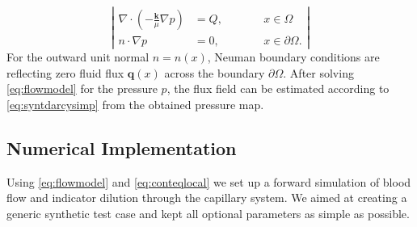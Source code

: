 \documentclass[journal,twocolumn]{IEEEtran}
\newcommand{\vq}{\mathbf{q}}
\begin{document}
	\begin{equation}
		\left\vert
		\begin{alignedat}{2}
			\nabla \cdot \left( -\frac{\mathbf{k}}{\mu} \nabla p \right) &= Q,  \qquad &&x \in \Omega \\
			n \cdot \nabla p &=0, &&x \in \partial \Omega.
		\end{alignedat}
		\right\vert 
		\label{eq:flowmodel}
	\end{equation}
	For the outward unit normal $n=n(x)$, Neuman boundary conditions are reflecting zero fluid flux $\vq(x)$ across the boundary $\partial \Omega$.
	After solving \eqref{eq:flowmodel} for the pressure $p$, the flux field can be estimated according to \eqref{eq:syntdarcysimp} from the obtained pressure map. 

	

	
	
		
	\subsection{Numerical Implementation}\label{sec:NumExp}
	Using \eqref{eq:flowmodel} and \eqref{eq:conteqlocal} we set up a forward simulation of blood flow and indicator dilution through the capillary system.
	We aimed at creating a generic synthetic test case and kept all optional parameters as simple as possible. 
\end{document}
